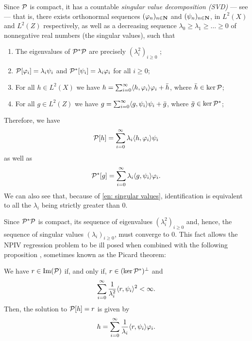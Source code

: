 Since $ \mathcal{P} $ is compact, it has a countable \emph{singular value decomposition (SVD)} --- see \cite[section 15.4]{kress89} --- that is, there exists orthonormal sequences $ ( \varphi_{ n } )_{ n\in\mathbf{N} } $ and $ ( \psi_{ n } )_{ n\in\mathbf{N} } $, in $ L^2 ( X ) $ and $ L^2 ( Z ) $ respectively, as well as a decreasing sequence $ \lambda_{ 0 } \geq \lambda_{ 1 } \geq \dots \geq 0 $ of nonnegative real numbers (the singular values), such that
\begin{enumerate}[label=(\alph*)]
    \item The eigenvalues of $ \mathcal{P}^{ * } \mathcal{P} $ are precisely $ ( \lambda_{ i }^2 )_{ i \geq 0 } $ \label{en: singular values};
    \item $ \mathcal{P} [ \varphi_{ i } ] = \lambda_{ i } \psi_{ i } $ and $ \mathcal{P}^{ * } [ \psi_{ i } ] = \lambda_{ i } \varphi_{ i } $ for all $ i \geq 0 $;
    \item For all $ h \in L^2 ( X ) $ we have $ h = \sum_{ i=0 }^{ \infty } \langle  h, \varphi_{ i }  \rangle \varphi_{ i } + \bar{ h } $, where $ \bar{ h } \in \ker \mathcal{P} $;
    \item For all $ g \in L^2 ( Z ) $ we have $ g = \sum_{ i=0 }^{ \infty } \langle  g, \psi_{ i }  \rangle \psi_{ i } + \bar{ g } $, where $ \bar{ g } \in \ker \mathcal{P}^{ * } $;
\end{enumerate}
Therefore, we have
\begin{equation*}
    \mathcal{P} [ h ] = \sum_{ i=0 }^{ \infty } \lambda_{ i } \langle  h, \varphi_{ i }  \rangle \psi_{ i }
\end{equation*}
as well as
\begin{equation*}
    \mathcal{P}^{ * } [ g ] = \sum_{ i=0 }^{ \infty } \lambda_{ i } \langle  g, \psi_{ i }  \rangle \varphi_{ i }
.\end{equation*}
We can also see that, because of \ref{en: singular values}, identification is equivalent to all the $ \lambda_{ i } $ being strictly greater than $ 0 $.

Since $ \mathcal{P}^{ * } \mathcal{P} $ is compact, its sequence of eigenvalues $ ( \lambda_{ i }^2 )_{ i \geq 0 } $ and, hence, the sequence of singular values $ ( \lambda_{ i } )_{ i \geq 0 } $, must converge to $ 0 $.
This fact allows the NPIV regression problem to be ill posed when combined with the following proposition \cite[theorem 15.18]{kress89}, sometimes known as the Picard theorem:
\begin{prop}
    \label{prop: picard}
    We have $ r \in \operatorname{Im} ( \mathcal{P} ) $ if, and only if, $ r \in ( \ker \mathcal{P}^{ * } )^{ \perp } $ and
    \begin{equation*}
        \sum_{ i=0 }^{ \infty } \frac{ 1 }{ \lambda_{ i }^2 } \langle  r, \psi_{ i }  \rangle^2 < \infty
    .\end{equation*}
    Then, the solution to $ \mathcal{P} [ h ] = r $ is given by
    \begin{equation}
        \label{eq: closed form solution}
        h = \sum_{ i=0 }^{ \infty } \frac{ 1 }{ \lambda_{ i } } \langle  r, \psi_{ i }  \rangle \varphi_{ i }
    .\end{equation}
\end{prop}

